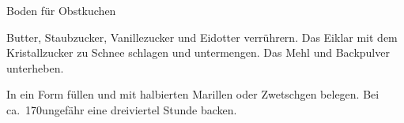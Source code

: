 \begin{recipe}[\vegetarian]{Boden für Obstkuchen}

    \begin{ingredients}
    \end{ingredients}

    \begin{instructions}
        Butter, Staubzucker, Vanillezucker und Eidotter verrührern.
        Das Eiklar mit dem Kristallzucker zu Schnee schlagen und untermengen.
        Das Mehl und Backpulver unterheben.

        In ein Form füllen und mit halbierten Marillen oder Zwetschgen belegen.
        Bei ca.~170\degC ungefähr eine dreiviertel Stunde backen.
    \end{instructions}
\end{recipe}

